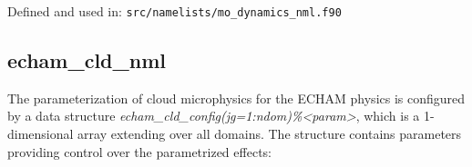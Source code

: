 Defined and used in: \verb+src/namelists/mo_dynamics_nml.f90+




\subsection{echam\_cld\_nml}

The parameterization of cloud microphysics for the ECHAM physics is configured by a data structure \textit{echam\_cld\_config(jg=1:ndom)\%<param>}, which is a 1-dimensional array extending over all  domains. The structure contains parameters providing control over the parametrized effects:

